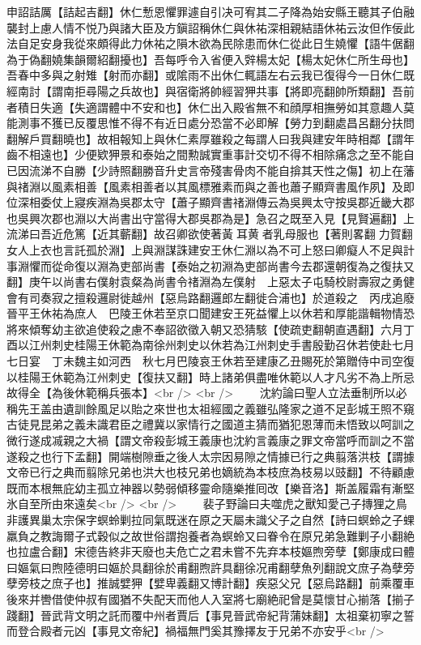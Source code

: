 申詔詰厲【詰起吉翻】休仁慙恩懼罪遽自引决可宥其二子降為始安縣王聽其子伯融襲封上慮人情不悦乃與諸大臣及方鎭詔稱休仁與休祐深相親結語休祐云汝但作佞此法自足安身我從來頗得此力休祐之隕木欲為民除患而休仁從此日生嬈懼【語牛倨翻為于偽翻嬈集韻爾紹翻擾也】吾每呼令入省便入辤楊太妃【楊太妃休仁所生母也】吾春中多與之射雉【射而亦翻】或隂雨不出休仁輒語左右云我已復得今一日休仁既經南討【謂南拒尋陽之兵故也】與宿衛將帥經習狎共事【將即亮翻帥所類翻】吾前者積日失適【失適謂體中不安和也】休仁出入殿省無不和顔厚相撫勞如其意趣人莫能測事不獲已反覆思惟不得不有近日處分恐當不必即解【勞力到翻處昌呂翻分扶問翻解戶買翻曉也】故相報知上與休仁素厚雖殺之每謂人曰我與建安年時相鄰【謂年齒不相遠也】少便欵狎景和泰始之間勲誠實重事計交切不得不相除痛念之至不能自已因流涕不自勝【少詩照翻勝音升史言帝殘害骨肉不能自揜其天性之傷】初上在藩與禇淵以風素相善【風素相善者以其風標雅素而與之善也蕭子顯齊書風作夙】及即位深相委仗上寢疾淵為吳郡太守【蕭子顯齊書禇淵傳云為吳興太守按吳郡近畿大郡也吳興次郡也淵以大尚書出守當得大郡吳郡為是】急召之既至入見【見賢遍翻】上流涕曰吾近危篤【近其蘄翻】故召卿欲使著黃耳黄者乳母服也【著則畧翻力賀翻女人上衣也言託孤於淵】上與淵謀誅建安王休仁淵以為不可上怒曰卿癡人不足與計事淵懼而從命復以淵為吏部尚書【泰始之初淵為吏部尚書今去郡還朝復為之復扶又翻】庚午以尚書右僕射袁粲為尚書令禇淵為左僕射　上惡太子屯騎校尉壽寂之勇健會有司奏寂之擅殺邏尉徙越州【惡烏路翻邏郎左翻徙合浦也】於道殺之　丙戌追廢晉平王休祐為庶人　巴陵王休若至京口聞建安王死益懼上以休若和厚能諧輯物情恐將來傾奪幼主欲追使殺之慮不奉詔欲徵入朝又恐猜駭【使疏吏翻朝直遇翻】六月丁酉以江州刺史桂陽王休範為南徐州刺史以休若為江州刺史手書殷勤召休若使赴七月七日宴　丁未魏主如河西　秋七月巴陵哀王休若至建康乙丑賜死於第贈侍中司空復以桂陽王休範為江州刺史【復扶又翻】時上諸弟俱盡唯休範以人才凡劣不為上所忌故得全【為後休範稱兵張本】<br />
<br />
　　沈約論曰聖人立法垂制所以必稱先王盖由遺訓餘風足以貽之來世也太祖經國之義雖弘隆家之道不足彭城王照不窺古徒見昆弟之義未識君臣之禮冀以家情行之國道主猜而猶犯恩薄而未悟致以呵訓之微行遂成㓕親之大禍【謂文帝殺彭城王義康也沈約言義康之罪文帝當呼而訓之不當遂殺之也行下孟翻】開端樹隙垂之後人太宗因易隙之情據已行之典翦落洪枝【謂據文帝已行之典而翦除兄弟也洪大也枝兄弟也嫡統為本枝庶為枝易以豉翻】不待顧慮既而本根無庇幼主孤立神器以勢弱傾移靈命隨樂推囘改【樂音洛】斯盖履霜有漸堅氷自至所由來遠矣<br />
<br />
　　裴子野論曰夫噬虎之獸知愛己子摶狸之鳥非護異巢太宗保字螟蛉剿拉同氣既迷在原之天屬未識父子之自然【詩曰螟蛉之子蜾羸負之教誨爾子式穀似之故世俗謂抱養者為螟蛉又曰眷令在原兄弟急難剿子小翻絶也拉盧合翻】宋德告終非天廢也夫危亡之君未嘗不先弃本枝嫗煦旁孽【鄭康成曰體曰嫗氣曰煦陸德明曰嫗於具翻徐於甫翻煦許具翻徐况甫翻孽魚列翻說文庶子為孽旁孽旁枝之庶子也】推誠嬖狎【嬖卑義翻又博計翻】疾惡父兄【惡烏路翻】前乘覆車後來并轡借使仲叔有國猶不失配天而他人入室將七廟絶祀曾是莫懷甘心揃落【揃子踐翻】晉武背文明之託而覆中州者賈后【事見晉武帝紀背蒲妹翻】太祖棄初寧之誓而登合殿者元凶【事見文帝紀】禍福無門奚其豫擇友于兄弟不亦安乎<br />
